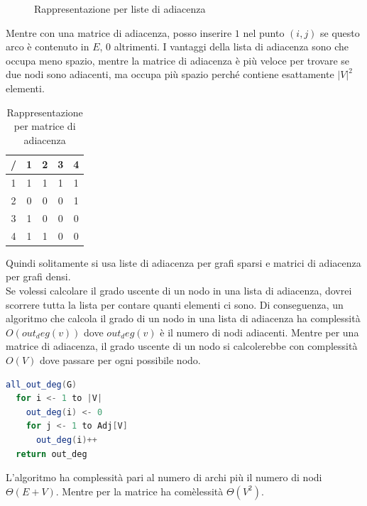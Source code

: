 \documentclass[a4paper]{article}
\begin{document}
\begin{figure}[H]
  \caption{Rappresentazione per liste di adiacenza}
\end{figure}
\noindent
Mentre con una matrice di adiacenza, posso inserire $1$ nel punto $(i,j)$ se questo arco è contenuto in $E$, $0$ altrimenti.
I vantaggi della lista di adiacenza sono che occupa meno spazio, mentre la matrice di adiacenza è più veloce per trovare se due nodi sono adiacenti, ma occupa più spazio perché contiene esattamente $|V|^2$ elementi.
\begin{table}[H]
  \centering
  \begin{tabular}{c|cccc}
    / & 1 & 2 & 3 & 4 \\
    \hline
    1 & 1 & 1 & 1 & 1 \\
    2 & 0 & 0 & 0 & 1 \\
    3 & 1 & 0 & 0 & 0 \\
    4 & 1 & 1 & 0 & 0 \\
  \end{tabular}
  \caption{Rappresentazione per matrice di adiacenza}
\end{table}
\noindent
Quindi solitamente si usa liste di adiacenza per grafi sparsi e matrici di adiacenza per grafi densi.
\\
Se volessi calcolare il grado uscente di un nodo in una lista di adiacenza, dovrei scorrere tutta la lista per contare quanti elementi ci sono.
Di conseguenza, un algoritmo che calcola il grado di un nodo in una lista di adiacenza ha complessità $O(out_deg(v))$ dove $out_deg(v)$ è il numero di nodi adiacenti.
Mentre per una matrice di adiacenza, il grado uscente di un nodo si calcolerebbe con complessità $O(V)$ dove passare per ogni possibile nodo.
\begin{lstlisting}[language=Scala]
all_out_deg(G)
  for i <- 1 to |V|
    out_deg(i) <- 0
    for j <- 1 to Adj[V]
      out_deg(i)++
  return out_deg
\end{lstlisting}
L'algoritmo ha complessità pari al numero di archi più il numero di nodi $\Theta(E + V)$.
Mentre per la matrice ha comèlessità $\Theta(V^2)$.
\end{document}
